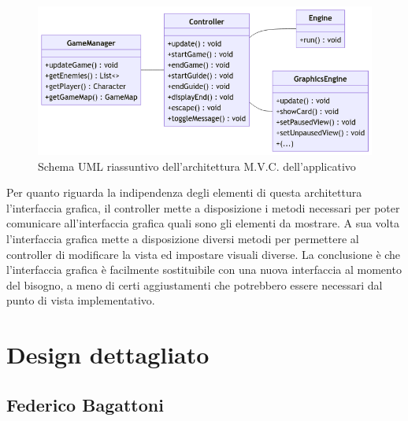 \documentclass[a4paper,12pt]{report}
\begin{document}
\begin{figure}[h]
\centering{}
\includegraphics[width=\textwidth]{img/mvc.png}
\caption{Schema UML riassuntivo dell'architettura M.V.C. dell'applicativo}
\end{figure}

\par 
Per quanto riguarda la indipendenza degli elementi di questa architettura l'interfaccia grafica, il controller mette a disposizione i metodi necessari per poter comunicare all'interfaccia grafica quali sono gli elementi da mostrare. A sua volta l'interfaccia grafica mette a disposizione diversi metodi per permettere al controller di modificare la vista ed impostare visuali diverse. La conclusione è che l'interfaccia grafica è facilmente sostituibile con una nuova interfaccia al momento del bisogno, a meno di certi aggiustamenti che potrebbero essere necessari dal punto di vista implementativo. 

\section{Design dettagliato}

\subsection{Federico Bagattoni}
\end{document}
